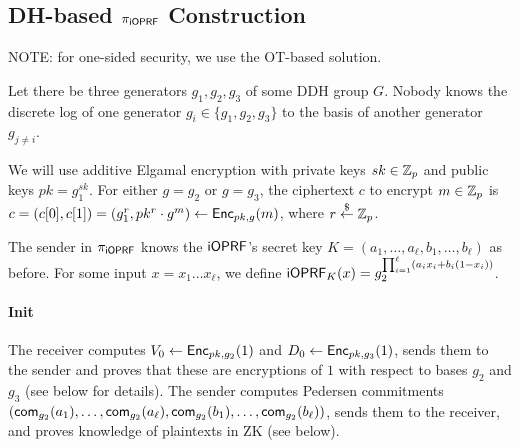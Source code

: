 \subsection{DH-based ${\pi_{\mathsf{i}\mathsf{OPRF}}}$ Construction}
NOTE: for one-sided security, we use the OT-based solution.

Let there be three generators $g_1,g_2,g_3$ of some DDH group $G$. Nobody
knows the discrete log of one generator $g_i\in\{g_1,g_2,g_3\}$ to
the basis of another generator $g_{j\neq{}i}$.

We will use additive Elgamal encryption with private keys $sk\in\mathbb{Z}_p$
and public keys $pk=g_1^{sk}$. For either $g=g_2$ or $g=g_3$, the
ciphertext $c$ to encrypt $m\in\mathbb{Z}_p$ is
$c=(c[0],c[1])=(g_1^r,pk^r\cdot{}g^m)\leftarrow{\mathsf{Enc}}_{pk,g}(m)$, where
$r\stackrel{\$}{\leftarrow}\mathbb{Z}_p$.

The sender in ${\pi_{\mathsf{i}\mathsf{OPRF}}}$ knows the $\mathsf{i}\mathsf{OPRF}$'s secret key
$K=(a_1,\ldots,a_\ell,b_1,\ldots,b_\ell)$ as before. For some input
$x=x_1\ldots{}x_\ell$, we define
$\mathsf{i}\mathsf{OPRF}_K(x)=g_2^{\prod_{i=1}^{\ell}(a_ix_i+b_i(1-x_i))}$.

\paragraph{Init}
The receiver computes $V_0 \leftarrow{\mathsf{Enc}}_{pk,g_2}(1)$ and
$D_0\leftarrow{\mathsf{Enc}}_{pk,g_3}(1)$, sends them to the sender and proves
that these are encryptions of $1$ with respect to bases $g_2$ and
$g_3$ (see below for details). The sender computes Pedersen
commitments
$(\mathsf{com}_{g_2}(a_1),\ldots,\mathsf{com}_{g_2}(a_\ell),\mathsf{com}_{g_2}(b_1),\ldots,\mathsf{com}_{g_2}(b_\ell))$,
sends them to the receiver, and proves knowledge of plaintexts in ZK
(see below).

